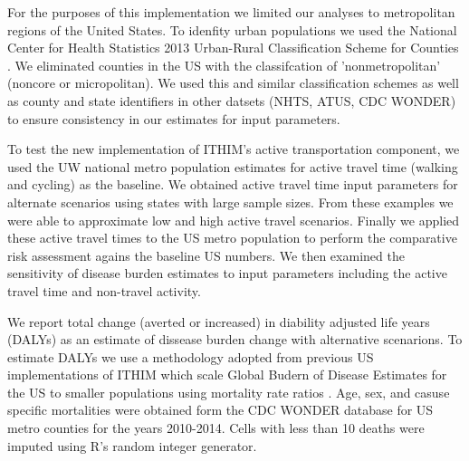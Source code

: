 
For the purposes of this implementation we limited our analyses to
metropolitan regions of the United States. To idenfity urban
populations we used the National Center for Health Statistics 2013
Urban-Rural Classification Scheme for Counties \cite{ingram2014}. We
eliminated counties in the US with the classifcation of
'nonmetropolitan' (noncore or micropolitan). We used this and similar
classification schemes as well as county and state identifiers in
other datsets (NHTS, ATUS, CDC WONDER) to ensure consistency in our
estimates for input parameters.

To test the new implementation of ITHIM's active transportation
component, we used the UW national metro population estimates for
active travel time (walking and cycling) as the baseline. We obtained
active travel time input parameters for alternate scenarios using
states with large sample sizes. From these examples we were able to
approximate low and high active travel scenarios. Finally we applied
these active travel times to the US metro population to perform the
comparative risk assessment agains the baseline US numbers. We then
examined the sensitivity of disease burden estimates to input
parameters including the active travel time and non-travel activity.

We report total change (averted or increased) in diability adjusted
life years (DALYs) as an estimate of dissease burden change with
alternative scenarions. To estimate DALYs we use a methodology adopted
from previous US implementations of ITHIM which scale Global Budern of
Disease Estimates for the US to smaller populations using mortality
rate ratios \cite{maizlish2013}. Age, sex, and casuse specific
mortalities were obtained form the CDC WONDER database for US metro
counties for the years 2010-2014. Cells with less than 10 deaths were
imputed using R's random integer generator.
